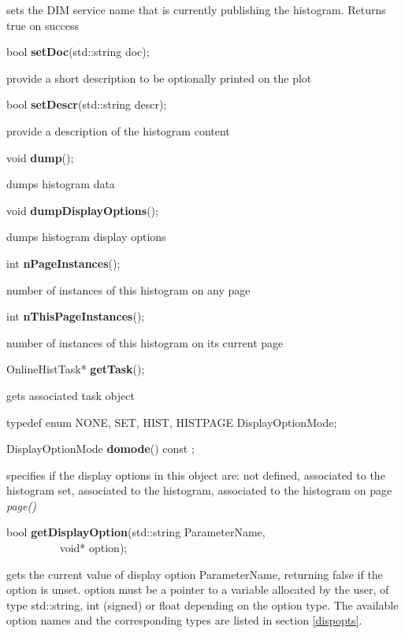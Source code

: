  sets the DIM service name that is currently publishing the histogram. Returns true on success


\item    bool {\bf setDoc}(std::string doc);


 provide a short description to be optionally printed on the plot 


\item    bool {\bf setDescr}(std::string descr);


 provide a  description of the histogram content 


\item    void {\bf dump}();


 dumps histogram data


\item    void {\bf dumpDisplayOptions}();


 dumps histogram display options


\item    int {\bf nPageInstances}();


 number of instances of this histogram on any page


\item    int {\bf nThisPageInstances}();


 number of instances of this histogram on its current page


\item    OnlineHistTask* {\bf getTask}();


 gets associated task object


\item   typedef enum { NONE, SET, HIST, HISTPAGE } DisplayOptionMode;
\item    DisplayOptionMode {\bf domode}() const ;

 specifies if the display options in this object are: not defined,
 associated to the histogram set, associated to the histogram,
 associated to the histogram on  page {\it page()}


\item    bool {\bf getDisplayOption}(std::string ParameterName,\\\mbox{}~~~~~~~~~
			void* option);

 gets the current value of display option ParameterName, returning false if
 the option is unset.
 option must be a pointer to a variable allocated by the user, of type 
 std::string, int (signed) or float depending on the option type.
 The available option names and the corresponding types are listed 
 in section \ref{dispopts}.


